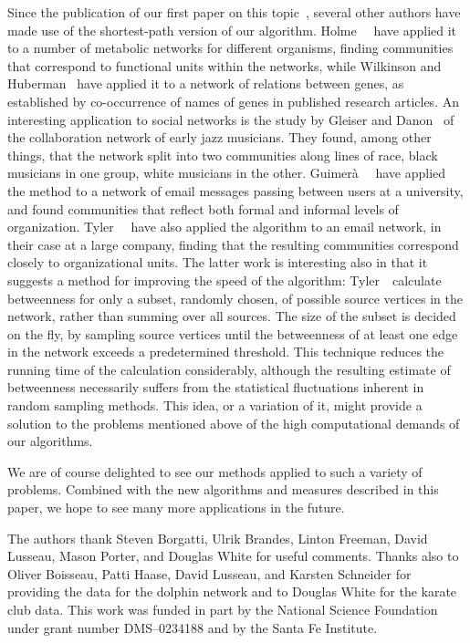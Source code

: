 \documentclass[twocolumn,pre,superscriptaddress]{revtex4}
\begin{document}
Since the publication of our first paper on this topic~\cite{GN02}, several
other authors have made use of the shortest-path version of our algorithm.
Holme~\etal~\cite{HHJ02} have applied it to a number of metabolic networks
for different organisms, finding communities that correspond to functional
units within the networks, while Wilkinson and Huberman~\cite{WH03} have
applied it to a network of relations between genes, as established by
co-occurrence of names of genes in published research articles.  An
interesting application to social networks is the study by Gleiser and
Danon~\cite{GD04} of the collaboration network of early jazz musicians.
They found, among other things, that the network split into two communities
along lines of race, black musicians in one group, white musicians in the
other.  Guimer\`a~\etal~\cite{Guimera03} have applied the method to a
network of email messages passing between users at a university, and found
communities that reflect both formal and informal levels of organization.
Tyler~\etal~\cite{TWH03} have also applied the algorithm to an email
network, in their case at a large company, finding that the resulting
communities correspond closely to organizational units.  The latter work is
interesting also in that it suggests a method for improving the speed of
the algorithm: Tyler~\etal\ calculate betweenness for only a subset,
randomly chosen, of possible source vertices in the network, rather than
summing over all sources.  The size of the subset is decided on the fly, by
sampling source vertices until the betweenness of at least one edge in the
network exceeds a predetermined threshold.  This technique reduces the
running time of the calculation considerably, although the resulting
estimate of betweenness necessarily suffers from the statistical
fluctuations inherent in random sampling methods.  This idea, or a
variation of it, might provide a solution to the problems mentioned above
of the high computational demands of our algorithms.

We are of course delighted to see our methods applied to such a variety of
problems.  Combined with the new algorithms and measures described in this
paper, we hope to see many more applications in the future.


\begin{acknowledgments}
The authors thank Steven Borgatti, Ulrik Brandes, Linton Freeman, David
Lusseau, Mason Porter, and Douglas White for useful comments.  Thanks also
to Oliver Boisseau, Patti Haase, David Lusseau, and Karsten Schneider for
providing the data for the dolphin network and to Douglas White for the
karate club data.  This work was funded in part by the National Science
Foundation under grant number DMS--0234188 and by the Santa Fe Institute.
\end{acknowledgments}
\end{document}
